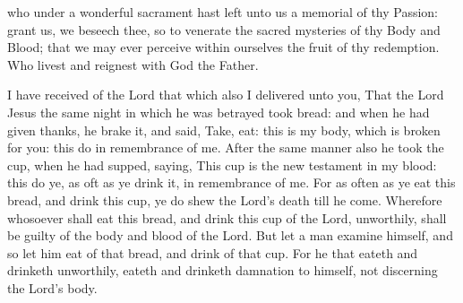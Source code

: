 \collect
{} who under a wonderful sacrament hast left unto us a memorial of thy Passion: grant us, we beseech thee, so to venerate the sacred mysteries of thy Body and Blood; that we may ever perceive within ourselves the fruit of thy redemption. Who livest and reignest with God the Father.

 I have received of the Lord that which also I delivered unto you, That the Lord Jesus the same night in which he was betrayed took bread: and when he had given thanks, he brake it, and said, Take, eat: this is my body, which is broken for you: this do in remembrance of me. After the same manner also he took the cup, when he had supped, saying, This cup is the new testament in my blood: this do ye, as oft as ye drink it, in remembrance of me. For as often as ye eat this bread, and drink this cup, ye do shew the Lord's death till he come. Wherefore whosoever shall eat this bread, and drink this cup of the Lord, unworthily, shall be guilty of the body and blood of the Lord. But let a man examine himself, and so let him eat of that bread, and drink of that cup. For he that eateth and drinketh unworthily, eateth and drinketh damnation to himself, not discerning the Lord's body.



